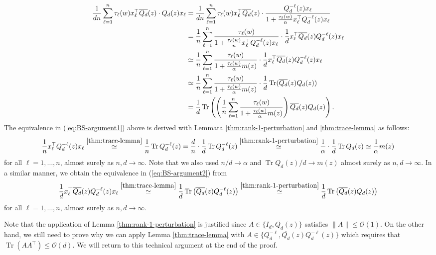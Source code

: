 \documentclass{article}
\begin{document}
 \begin{align}
\frac{1}{dn}\sum_{\ell=1}^n\tau_\ell(w)  x_\ell^\top\overline{Q_d}(z)\cdot Q_d(z)x_\ell &= \frac{1}{dn}\sum_{\ell=1}^n\tau_\ell(w) x_\ell^\top\overline{Q_d}(z)\cdot \frac{Q_d^{-\ell}(z)x_\ell}{1+\frac{\tau_\ell(w)}{n}x_\ell^\top Q_d^{-\ell}(z)x_\ell} \notag
\\ &= \frac{1}{n}\sum_{\ell=1}^n\frac{\tau_\ell(w)}{1+\frac{\tau_\ell(w)}{n}x_\ell^\top Q_d^{-\ell}(z)x_\ell}\cdot\frac{1}{d}x_\ell^\top\overline{Q_d}(z)Q_d^{-\ell}(z)x_\ell \notag
\\ &\simeq \frac{1}{n}\sum_{\ell=1}^n\frac{\tau_\ell(w)}{1+\frac{\tau_\ell(w)}{\alpha}m(z)}\cdot\frac{1}{d}x_\ell^\top\overline{Q_d}(z)Q_d^{-\ell}(z)x_\ell \label{eq:BS-argument1}
\\ &\simeq \frac{1}{n}\sum_{\ell=1}^n\frac{\tau_\ell(w)}{1+\frac{\tau_\ell(w)}{\alpha}m(z)}\cdot\frac{1}{d}\operatorname{Tr}(\overline{Q_d}(z)Q_d(z)) \label{eq:BS-argument2}
\\ &= \frac{1}{d}\operatorname{Tr}\left(\left(\frac{1}{n}\sum_{\ell=1}^n\frac{\tau_\ell(w)}{1+\frac{\tau_\ell(w)}{\alpha}m(z)}\right)\overline{Q_d}(z)Q_d(z)\right). \notag
\end{align}
The equivalence in (\ref{eq:BS-argument1}) above is derived with Lemmata \ref{thm:rank-1-perturbation} and \ref{thm:trace-lemma} as follows:
\begin{equation}
\frac{1}{n}x_\ell^\top Q_d^{-\ell}(z)x_\ell \stackrel{\ref{thm:trace-lemma}}{\simeq} \frac{1}{n}\operatorname{Tr}Q_d^{-\ell}(z)=\frac{d}{n}\cdot\frac{1}{d}\operatorname{Tr}Q_d^{-\ell}(z)\stackrel{\ref{thm:rank-1-perturbation}}{\simeq}\frac{1}{\alpha}\cdot\frac{1}{d}\operatorname{Tr}Q_d(z) \simeq\frac{1}{\alpha}m(z)
\end{equation}
for all $\ell=1,\dots,n$, almost surely as $n,d\to\infty$. Note that we also used $n/d\to\alpha$ and $\operatorname{Tr}Q_d(z)/d\to m(z)$ almost surely as $n,d\to\infty$. In a similar manner, we obtain the equivalence in (\ref{eq:BS-argument2}) from
\begin{equation}
\frac{1}{d}x_\ell^\top\overline{Q_d}(z)Q_d^{-\ell}(z)x_\ell \stackrel{\ref{thm:trace-lemma}}{\simeq} \frac{1}{d}\operatorname{Tr}\left(\overline{Q_d}(z)Q_d^{-\ell}(z)\right) \stackrel{\ref{thm:rank-1-perturbation}}{\simeq} \frac{1}{d}\operatorname{Tr}\left(\overline{Q_d}(z)Q_d(z)\right)
\end{equation}
for all $\ell=1,\dots,n$, almost surely as $n,d\to\infty$.
\bigskip
\par
Note that the application of Lemma \ref{thm:rank-1-perturbation} is justified since $A\in\{I_d,\overline{Q_d}(z)\}$ satisfies $\|A\|\leq\mathcal{O}(1)$. On the other hand, we still need to prove why we can apply Lemma \ref{thm:trace-lemma} with $A\in\{Q_d^{-\ell},\overline{Q_d}(z)Q_d^{-\ell}(z)\}$ which requires that $\operatorname{Tr}(AA^\top)\leq\mathcal{O}(d)$. We will return to this technical argument at the end of the proof.
\end{document}
